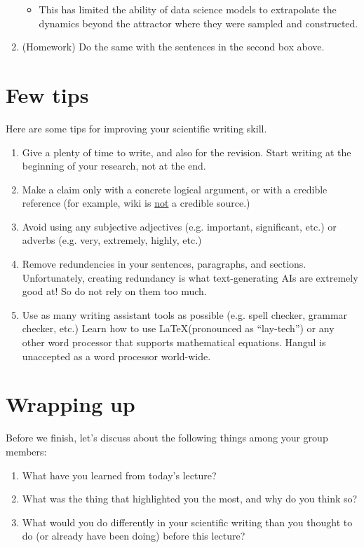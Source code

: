 \documentclass{article}
\begin{document}
\begin{enumerate}
\begin{itemize}
        \vspace{1in}
        \item This has limited the ability of data science models to extrapolate the dynamics beyond the attractor where they were sampled and constructed. 
        \vspace{1in}
    \end{itemize}
    \item (Homework) Do the same with the sentences in the second box above.
\end{enumerate}



\section{Few tips}
Here are some tips for improving your scientific writing skill.
\begin{enumerate}
    \item Give a plenty of time to write, and also for the revision. Start writing at the beginning of your research, not at the end.
    \item Make a claim only with a concrete logical argument, or with a credible reference (for example, wiki is \underline{not} a credible source.)
    \item Avoid using any subjective adjectives (e.g. important, significant, etc.) or adverbs (e.g. very, extremely, highly, etc.)
    \item Remove redundencies in your sentences, paragraphs, and sections. Unfortunately, creating redundancy is what text-generating AIs are extremely good at! So do not rely on them too much.
    \item Use as many writing assistant tools as possible (e.g. spell checker, grammar checker, etc.) Learn how to use \LaTeX (pronounced as ``lay-tech'') or any other word processor that supports mathematical equations. Hangul\textsuperscript{\textregistered} is unaccepted as a word processor world-wide.
\end{enumerate}

\section{Wrapping up}
Before we finish, let's discuss about the following things among your group members:
\begin{enumerate}
    \item What have you learned from today's lecture?
    \vspace{2in}
    \item What was the thing that highlighted you the most, and why do you think so?
    \vspace{2in}
    \item What would you do differently in your scientific writing than you thought to do (or already have been doing) before this lecture?
    \vspace{2in}
\end{enumerate}
\end{document}
